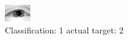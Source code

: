 \begin{figure}[h!]
\begin{center}
\includegraphics[width=0.60\columnwidth]{figures/ID2288_class_1_target_2.png}
\end{center}
\caption{ Classification: 1 actual target: 2}
\label{fig:ID2288_class_1_target_2}
\end{figure}

